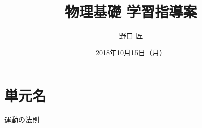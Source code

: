 \documentclass[a4paper,11pt,dvipdfmx,uplatex,%
ja=standard]{bxjsarticle}
\title{物理基礎 学習指導案} %
\date{2018年10月15日（月）} %
\author{野口 匠} %
\begin{document}
\maketitle
\section{単元名}
運動の法則
\end{document}
